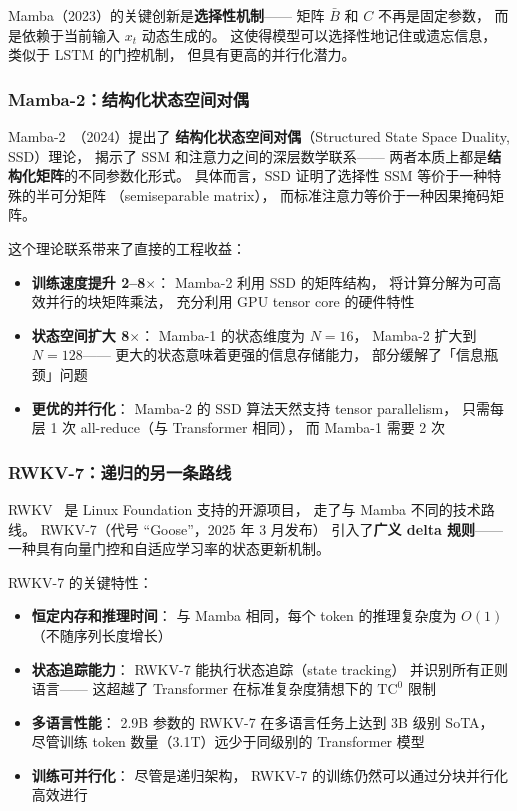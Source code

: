 Mamba（2023）的关键创新是\textbf{选择性机制}——
矩阵 $\bar{B}$ 和 $C$ 不再是固定参数，
而是依赖于当前输入 $x_t$ 动态生成的。
这使得模型可以选择性地记住或遗忘信息，
类似于 LSTM 的门控机制，
但具有更高的并行化潜力。

\subsubsection{Mamba-2：结构化状态空间对偶}

Mamba-2~\cite{dao2024mamba2}（2024）提出了
\textbf{结构化状态空间对偶}（Structured State Space Duality, SSD）理论，
揭示了 SSM 和注意力之间的深层数学联系——
两者本质上都是\textbf{结构化矩阵}的不同参数化形式。
具体而言，SSD 证明了选择性 SSM 等价于一种特殊的半可分矩阵
（semiseparable matrix），
而标准注意力等价于一种因果掩码矩阵。

这个理论联系带来了直接的工程收益：
\begin{itemize}[noitemsep]
  \item \textbf{训练速度提升 2--8$\times$}：
        Mamba-2 利用 SSD 的矩阵结构，
        将计算分解为可高效并行的块矩阵乘法，
        充分利用 GPU tensor core 的硬件特性
  \item \textbf{状态空间扩大 8$\times$}：
        Mamba-1 的状态维度为 $N = 16$，
        Mamba-2 扩大到 $N = 128$——
        更大的状态意味着更强的信息存储能力，
        部分缓解了「信息瓶颈」问题
  \item \textbf{更优的并行化}：
        Mamba-2 的 SSD 算法天然支持 tensor parallelism，
        只需每层 1 次 all-reduce（与 Transformer 相同），
        而 Mamba-1 需要 2 次
\end{itemize}

\subsubsection{RWKV-7：递归的另一条路线}

RWKV~\cite{peng2025rwkv7} 是 Linux Foundation 支持的开源项目，
走了与 Mamba 不同的技术路线。
RWKV-7（代号 ``Goose''，2025 年 3 月发布）
引入了\textbf{广义 delta 规则}——
一种具有向量门控和自适应学习率的状态更新机制。

RWKV-7 的关键特性：
\begin{itemize}[noitemsep]
  \item \textbf{恒定内存和推理时间}：
        与 Mamba 相同，每个 token 的推理复杂度为 $O(1)$
        （不随序列长度增长）
  \item \textbf{状态追踪能力}：
        RWKV-7 能执行状态追踪（state tracking）
        并识别所有正则语言——
        这超越了 Transformer 在标准复杂度猜想下的 $\mathrm{TC}^0$ 限制
  \item \textbf{多语言性能}：
        2.9B 参数的 RWKV-7 在多语言任务上达到 3B 级别 SoTA，
        尽管训练 token 数量（3.1T）远少于同级别的 Transformer 模型
  \item \textbf{训练可并行化}：
        尽管是递归架构，
        RWKV-7 的训练仍然可以通过分块并行化高效进行
\end{itemize}

